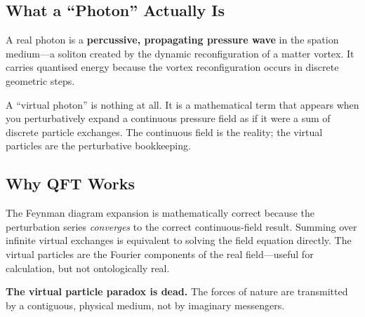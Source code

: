 \subsection{What a ``Photon'' Actually Is}

A real photon is a \textbf{percussive, propagating pressure wave} in the spation medium---a soliton created by the dynamic reconfiguration of a matter vortex. It carries quantised energy because the vortex reconfiguration occurs in discrete geometric steps.

A ``virtual photon'' is nothing at all. It is a mathematical term that appears when you perturbatively expand a continuous pressure field as if it were a sum of discrete particle exchanges. The continuous field is the reality; the virtual particles are the perturbative bookkeeping.

\subsection{Why QFT Works}

The Feynman diagram expansion is mathematically correct because the perturbation series \emph{converges} to the correct continuous-field result. Summing over infinite virtual exchanges is equivalent to solving the field equation directly. The virtual particles are the Fourier components of the real field---useful for calculation, but not ontologically real.

\textbf{The virtual particle paradox is dead.} The forces of nature are transmitted by a contiguous, physical medium, not by imaginary messengers.
